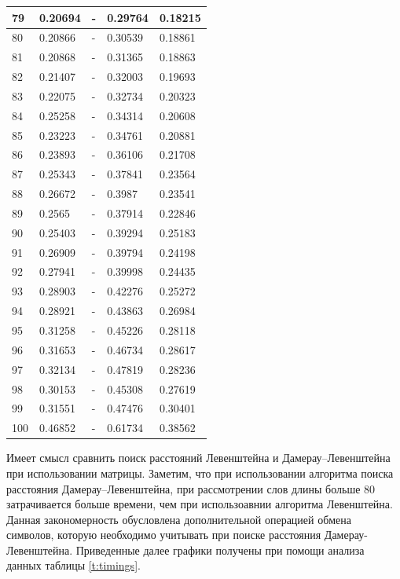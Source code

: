 \begin{tiny}
\begin{longtable}{|l|l|l|l|l|}
        79 & 0.20694 & - & 0.29764 & 0.18215 \\ \hline
        80 & 0.20866 & - & 0.30539 & 0.18861 \\ \hline
        81 & 0.20868 & - & 0.31365 & 0.18863 \\ \hline
        82 & 0.21407 & - & 0.32003 & 0.19693 \\ \hline
        83 & 0.22075 & - & 0.32734 & 0.20323 \\ \hline
        84 & 0.25258 & - & 0.34314 & 0.20608 \\ \hline
        85 & 0.23223 & - & 0.34761 & 0.20881 \\ \hline
        86 & 0.23893 & - & 0.36106 & 0.21708 \\ \hline
        87 & 0.25343 & - & 0.37841 & 0.23564 \\ \hline
        88 & 0.26672 & - & 0.3987 & 0.23541 \\ \hline
        89 & 0.2565 & - & 0.37914 & 0.22846 \\ \hline
        90 & 0.25403 & - & 0.39294 & 0.25183 \\ \hline
        91 & 0.26909 & - & 0.39794 & 0.24198 \\ \hline
        92 & 0.27941 & - & 0.39998 & 0.24435 \\ \hline
        93 & 0.28903 & - & 0.42276 & 0.25272 \\ \hline
        94 & 0.28921 & - & 0.43863 & 0.26984 \\ \hline
        95 & 0.31258 & - & 0.45226 & 0.28118 \\ \hline
        96 & 0.31653 & - & 0.46734 & 0.28617 \\ \hline
        97 & 0.32134 & - & 0.47819 & 0.28236 \\ \hline
        98 & 0.30153 & - & 0.45308 & 0.27619 \\ \hline
        99 & 0.31551 & - & 0.47476 & 0.30401 \\ \hline
        100 & 0.46852 & - & 0.61734 & 0.38562 \\ \hline
    \end{longtable}
\end{tiny}

Имеет смысл сравнить поиск расстояний Левенштейна и Дамерау--Левенштейна при использовании матрицы. Заметим, что при использовании
алгоритма поиска расстояния Дамерау--Левенштейна, при рассмотрении слов длины больше 80 затрачивается больше времени, чем 
при использоавнии алгоритма Левенштейна. Данная закономерность обусловлена дополнительной операцией обмена символов, которую 
необходимо учитывать при поиске расстояния Дамерау-Левенштейна. Приведенные далее графики  получены при 
помощи анализа данных таблицы \ref{t:timings}.


